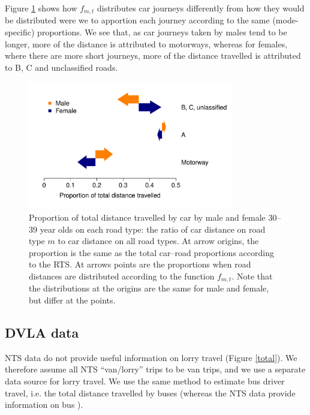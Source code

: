\documentclass{article}
\begin{document}
Figure \ref{carMF30} shows how $f_{m,t}$ distributes car journeys differently from how they would be distributed were we to apportion each journey according to the same (mode-specific) proportions. We see that, as car journeys taken by males tend to be longer, more of the distance is attributed to motorways, whereas for females, where there are more short journeys, more of the distance travelled is attributed to B, C and unclassified roads.

\begin{figure}[H]
\centering
\includegraphics[width=0.8\textwidth]{carMF30.pdf}
\caption[Proportion of total distance travelled by car by male and female 30--39 year olds on each road type.]{\small Proportion of total distance travelled by car by male and female 30--39 year olds on each road type: the ratio of car distance on road type $m$ to car distance on all road types. At arrow origins, the proportion is the same as the total car--road proportions according to the RTS. At arrows points are the proportions when road distances are distributed according to the function $f_{m,t}$. Note that the distributions at the origins are the same for male and female, but differ at the points.}
\label{carMF30}
\end{figure}


\subsection{DVLA data}\label{dvla}

NTS data do not provide useful information on lorry travel (Figure \ref{total}). We therefore assume all NTS ``van/lorry'' trips to be van trips, and we use a separate data source for lorry travel. We use the same method to estimate bus driver travel, i.e. the total distance travelled by buses (whereas the NTS data provide information on bus ).
\end{document}
